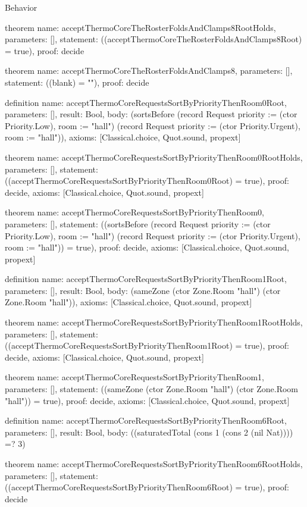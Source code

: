 \begin{lexlean}{Behavior}
\begin{semanticmodule}
theorem{
  name: acceptThermoCoreTheRosterFoldsAndClamps8RootHolds,
  parameters: [],
  statement: ((acceptThermoCoreTheRosterFoldsAndClamps8Root) = true),
  proof: decide{}
}

theorem{
  name: acceptThermoCoreTheRosterFoldsAndClamps8,
  parameters: [],
  statement: ((blank) = ""),
  proof: decide{}
}

definition{
  name: acceptThermoCoreRequestsSortByPriorityThenRoom0Root,
  parameters: [],
  result: Bool,
  body: (sortsBefore (record Request {priority := (ctor Priority.Low), room := "hall"}) (record Request {priority := (ctor Priority.Urgent), room := "hall"})),
  axioms: [Classical.choice, Quot.sound, propext]
}

theorem{
  name: acceptThermoCoreRequestsSortByPriorityThenRoom0RootHolds,
  parameters: [],
  statement: ((acceptThermoCoreRequestsSortByPriorityThenRoom0Root) = true),
  proof: decide{},
  axioms: [Classical.choice, Quot.sound, propext]
}

theorem{
  name: acceptThermoCoreRequestsSortByPriorityThenRoom0,
  parameters: [],
  statement: ((sortsBefore (record Request {priority := (ctor Priority.Low), room := "hall"}) (record Request {priority := (ctor Priority.Urgent), room := "hall"})) = true),
  proof: decide{},
  axioms: [Classical.choice, Quot.sound, propext]
}

definition{
  name: acceptThermoCoreRequestsSortByPriorityThenRoom1Root,
  parameters: [],
  result: Bool,
  body: (sameZone (ctor Zone.Room "hall") (ctor Zone.Room "hall")),
  axioms: [Classical.choice, Quot.sound, propext]
}

theorem{
  name: acceptThermoCoreRequestsSortByPriorityThenRoom1RootHolds,
  parameters: [],
  statement: ((acceptThermoCoreRequestsSortByPriorityThenRoom1Root) = true),
  proof: decide{},
  axioms: [Classical.choice, Quot.sound, propext]
}

theorem{
  name: acceptThermoCoreRequestsSortByPriorityThenRoom1,
  parameters: [],
  statement: ((sameZone (ctor Zone.Room "hall") (ctor Zone.Room "hall")) = true),
  proof: decide{},
  axioms: [Classical.choice, Quot.sound, propext]
}

definition{
  name: acceptThermoCoreRequestsSortByPriorityThenRoom6Root,
  parameters: [],
  result: Bool,
  body: ((saturatedTotal (cons 1 (cons 2 (nil Nat)))) =? 3)
}

theorem{
  name: acceptThermoCoreRequestsSortByPriorityThenRoom6RootHolds,
  parameters: [],
  statement: ((acceptThermoCoreRequestsSortByPriorityThenRoom6Root) = true),
  proof: decide{}
}


\end{semanticmodule}
\end{lexlean}
